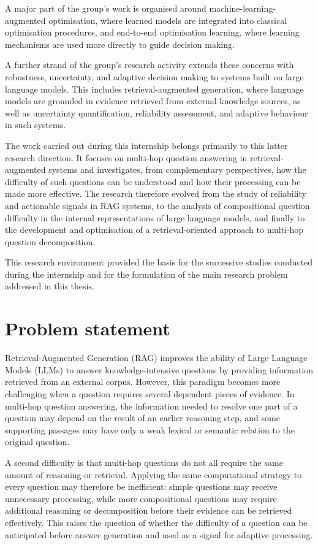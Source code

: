 A major part of the group's work is organised around machine-learning-augmented optimisation, where learned models 
are integrated into classical optimisation procedures, and end-to-end optimisation learning, where learning 
mechanisms are used more directly to guide decision making.

A further strand of the group's research activity extends these concerns with robustness, uncertainty, and 
adaptive decision making to systems built on large language models. This includes retrieval-augmented generation, 
where language models are grounded in evidence retrieved from external knowledge sources, as well as uncertainty 
quantification, reliability assessment, and adaptive behaviour in such systems.

The work carried out during this internship belongs primarily to this latter research direction. It focuses on 
multi-hop question answering in retrieval-augmented systems and investigates, from complementary perspectives, 
how the difficulty of such questions can be understood and how their processing can be made more effective. The 
research therefore evolved from the study of reliability and actionable signals in RAG systems, to the analysis of 
compositional question difficulty in the internal representations of large language models, and finally to the development and optimisation of a retrieval-oriented approach to multi-hop question decomposition.

This research environment provided the basis for the successive studies conducted during the internship and for the 
formulation of the main research problem addressed in this thesis.

\section{Problem statement}
\label{sec:ch1-problem-statement}

Retrieval-Augmented Generation (RAG) improves the ability of Large Language
Models (LLMs) to answer knowledge-intensive questions by providing information
retrieved from an external corpus. However, this paradigm becomes more
challenging when a question requires several dependent pieces of evidence.
In multi-hop question answering, the information needed to resolve one part of
a question may depend on the result of an earlier reasoning step, and some
supporting passages may have only a weak lexical or semantic relation to the
original question.

A second difficulty is that multi-hop questions do not all require the same
amount of reasoning or retrieval. Applying the same computational strategy to
every question may therefore be inefficient: simple questions may receive
unnecessary processing, while more compositional questions may require
additional reasoning or decomposition before their evidence can be retrieved
effectively. This raises the question of whether the difficulty of a question
can be anticipated before answer generation and used as a signal for adaptive
processing.

